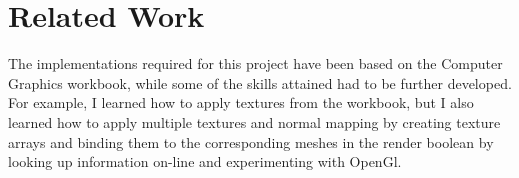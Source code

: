 \documentclass[10pt, a4paper]{article}
\begin{document}
    
	
	\section{Related Work}
	\iffalse
	\paragraph{Formatting}
	Some common formatting you may need uses these commands for \textbf{Bold Text}, \textit{Italics}, and \underline{underlined}.
	\fi
	
	The implementations required for this project have been based on the Computer Graphics workbook, while some of the skills attained had to be further developed. For example, I learned how to apply textures from the workbook, but I also learned how to apply multiple textures and normal mapping by creating texture arrays and binding them to the corresponding meshes in the render boolean by looking up information on-line and experimenting with OpenGl.
	
	\iffalse
	
	\subsection{LineBreaks}
	Here is a line
    
    Here is a line followed by a double line break.
	This line is only one line break down from the above, Notice that latex can ignore this
    
    We can force a break \\ with the break operator.
	
	\subsection{Code Listing}
    You can load segments of code from a file, or embed them directly.
    
\begin{lstlisting}[caption = Hello World! in c++]
#include <iostream>

int main() {
    std::cout << "Hello World!" << std::endl;
    std::cin.get();
    return 0;
}
\end{lstlisting}



	\fi
	
	

	
	
\end{document}
